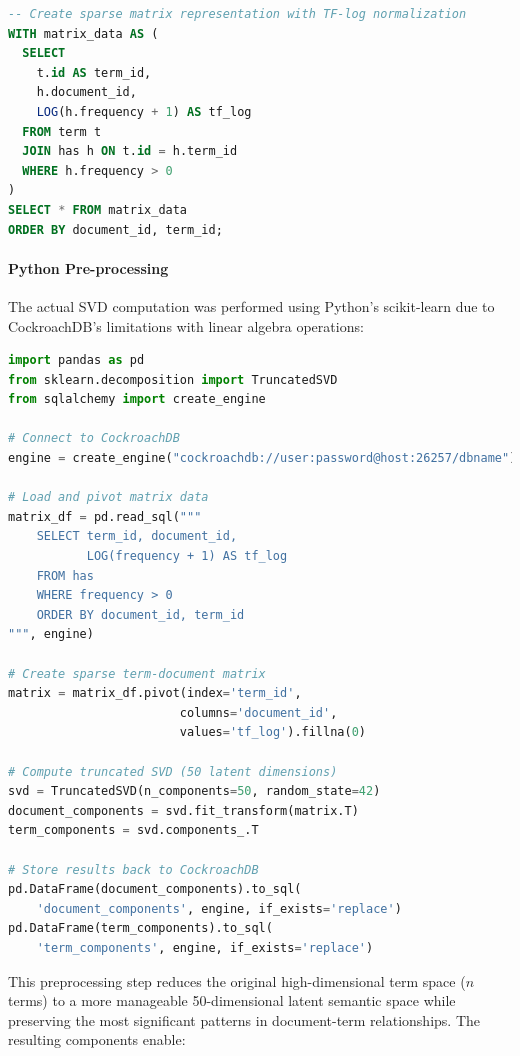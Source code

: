 \documentclass[twoside]{article}
\begin{document}
\begin{lstlisting}[language=SQL,caption={Term-Document Matrix Construction},label={lst:matrix}]
-- Create sparse matrix representation with TF-log normalization
WITH matrix_data AS (
  SELECT 
    t.id AS term_id,
    h.document_id,
    LOG(h.frequency + 1) AS tf_log 
  FROM term t
  JOIN has h ON t.id = h.term_id
  WHERE h.frequency > 0
)
SELECT * FROM matrix_data
ORDER BY document_id, term_id;
\end{lstlisting}

\paragraph{Python Pre-processing}
The actual SVD computation was performed using Python's scikit-learn due to CockroachDB's limitations with linear algebra operations:

\begin{lstlisting}[language=Python,caption={SVD Computation Script},label={lst:svd}]
import pandas as pd
from sklearn.decomposition import TruncatedSVD
from sqlalchemy import create_engine

# Connect to CockroachDB
engine = create_engine("cockroachdb://user:password@host:26257/dbname")

# Load and pivot matrix data
matrix_df = pd.read_sql("""
    SELECT term_id, document_id, 
           LOG(frequency + 1) AS tf_log 
    FROM has 
    WHERE frequency > 0
    ORDER BY document_id, term_id
""", engine)

# Create sparse term-document matrix
matrix = matrix_df.pivot(index='term_id', 
                        columns='document_id',
                        values='tf_log').fillna(0)

# Compute truncated SVD (50 latent dimensions)
svd = TruncatedSVD(n_components=50, random_state=42)
document_components = svd.fit_transform(matrix.T)
term_components = svd.components_.T

# Store results back to CockroachDB
pd.DataFrame(document_components).to_sql(
    'document_components', engine, if_exists='replace')
pd.DataFrame(term_components).to_sql(
    'term_components', engine, if_exists='replace')
\end{lstlisting}

This preprocessing step reduces the original high-dimensional term space (${n}$ terms) to a more manageable 50-dimensional latent semantic space while preserving the most significant patterns in document-term relationships. The resulting components enable:
\end{document}
